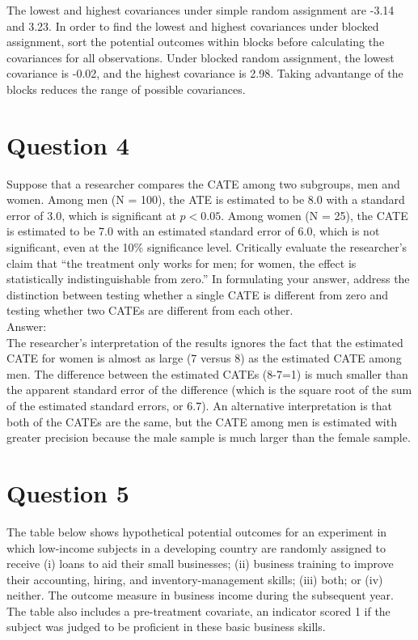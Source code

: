 \documentclass[11pt,notitlepage]{article}\usepackage[]{graphicx}\usepackage[]{color}
\begin{document}
The lowest and highest covariances under simple random assignment are -3.14 and 3.23.  In order to find the lowest and highest covariances under blocked assignment, sort the potential outcomes within blocks before calculating the covariances for all observations.  Under blocked random assignment, the lowest covariance is -0.02, and the highest covariance is 2.98. Taking advantange of the blocks reduces the range of possible covariances.


\section*{Question 4}
Suppose that a researcher compares the CATE among two subgroups, men and women. Among men (N = 100), the ATE is estimated to be 8.0 with a standard error of 3.0, which is significant at $p<0.05$. Among women (N = 25), the CATE is estimated to be 7.0 with an estimated standard error of 6.0, which is not significant, even at the 10\% significance level. Critically evaluate the researcher's claim that ``the treatment only works for men; for women, the effect is statistically indistinguishable from zero.'' In formulating your answer, address the distinction between testing whether a single CATE is different from zero and testing whether two CATEs are different from each other. \\
Answer:\\
The researcher's interpretation of the results ignores the fact that the estimated CATE for women is almost as large (7 versus 8) as the estimated CATE among men. The difference between the estimated CATEs (8-7=1) is much smaller than the apparent standard error of the difference (which is the square root of the sum of the estimated standard errors, or 6.7). An alternative interpretation is that both of the CATEs are the same, but the CATE among men is estimated with greater precision because the male sample is much larger than the female sample.

\section*{Question 5}
The table below shows hypothetical potential outcomes for an experiment in which low-income subjects in a developing country are randomly assigned to receive (i) loans to aid their small businesses; (ii) business training to improve their accounting, hiring, and inventory-management skills; (iii) both; or (iv) neither. The outcome measure in business income during the subsequent year. The table also includes a pre-treatment covariate, an indicator scored 1 if the subject was judged to be proficient in these basic business skills.
\end{document}
